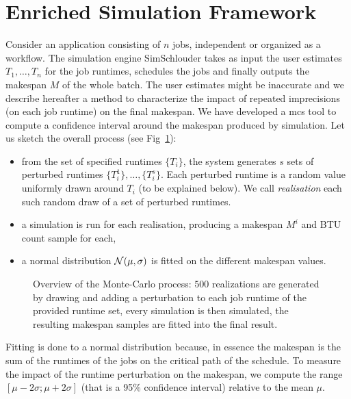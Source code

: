 \documentclass[10pt,conference,compsocconf]{IEEEtran}
\begin{document}
\section{Enriched Simulation Framework}
\label{sec:enriched-sim}


Consider an  application consisting of  $n$ jobs,  independent or organized  as a
workflow.  The simulation engine SimSchlouder  takes as input the user estimates
$T_1, \ldots , T_n$ for the job runtimes, schedules the jobs and finally outputs
the makespan $M$ of the whole batch.  The user estimates might be inaccurate
and  we describe  hereafter  a method  to characterize  the  impact of  repeated
imprecisions (on each  job runtime) on the final makespan.   We have developed a
\ac{mcs} tool to  compute a confidence interval around the  makespan produced by
simulation.  Let us sketch the overall process (see Fig~\ref{fig:mc-process}):
\begin{itemize} 
\item from  the set of  specified runtimes  $\{T_i\}$, the system  generates $s$
  sets  of perturbed  runtimes $\{T_i^1\},  \ldots, \{T_i^s\}$.   Each perturbed
  runtime  is a  random  value  uniformly drawn  around  $T_i$  (to be explained
  below). We call \emph{realisation} each such random draw of a set of perturbed
  runtimes.
\item a simulation  is run for each realisation, producing  a makespan $M^i$ and
  BTU count sample for each,
\item a  normal distribution ${\cal  N}(\mu,\sigma)$ is fitted on  the different
  makespan values.
\end{itemize}
\begin{figure}
	\centering
	\resizebox{0.5\textwidth}{!}{%
		
		}
\caption{Overview of the Monte-Carlo process: $500$ realizations are generated
by drawing and adding a perturbation to each job runtime of the provided
runtime set, every simulation is then simulated, the resulting makespan
samples are fitted into the final result.}\label{fig:mc-process}
\end{figure}
Fitting is done to a normal distribution because, in essence the makespan is the
sum  of the  runtimes of  the jobs  on the  critical path  of the  schedule.  To
measure the impact  of the runtime perturbation on the  makespan, we compute the
range $[\mu-2\sigma;\mu+2\sigma]$ (that is  a 95\% confidence interval) relative
to  the mean  $\mu$. 
\end{document}
